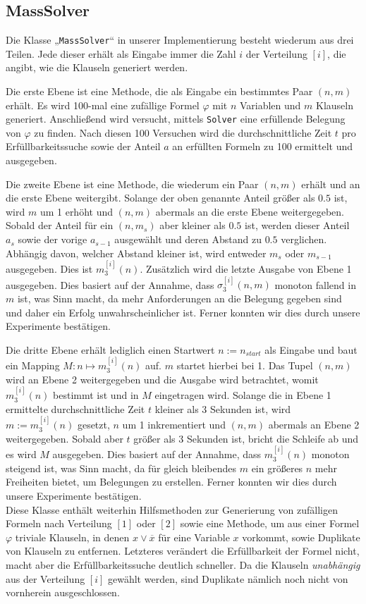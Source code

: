 \documentclass[maincolor=black]{exercise}
\newcommand{\anf}[1]{„#1“}
\newcommand{\non}[1]{\overline{#1}}
\begin{document}
\subsection{MassSolver}
Die Klasse \anf{\texttt{MassSolver}} in unserer Implementierung besteht wiederum aus drei Teilen. Jede dieser erhält als Eingabe immer die Zahl $i$ der Verteilung $[i]$, die angibt, wie die Klauseln generiert werden.\par
Die erste Ebene ist eine Methode, die als Eingabe ein bestimmtes Paar $(n,m)$ erhält. Es wird 100-mal eine zufällige Formel $\varphi$ mit $n$ Variablen und $m$ Klauseln generiert. Anschließend wird versucht, mittels \texttt{Solver} eine erfüllende Belegung von $\varphi$ zu finden. Nach diesen 100 Versuchen wird die durchschnittliche Zeit $t$ pro Erfüllbarkeitssuche sowie der Anteil $a$ an erfüllten Formeln zu 100 ermittelt und ausgegeben.\par
Die zweite Ebene ist eine Methode, die wiederum ein Paar $(n,m)$ erhält und an die erste Ebene weitergibt. Solange der oben genannte Anteil größer als $0.5$ ist, wird $m$ um 1 erhöht und $(n,m)$ abermals an die erste Ebene weitergegeben. Sobald der Anteil für ein $(n,m_s)$ aber kleiner als $0.5$ ist, werden dieser Anteil $a_s$ sowie der vorige $a_{s-1}$ ausgewählt und deren Abstand zu $0.5$ verglichen. Abhängig davon, welcher Abstand kleiner ist, wird entweder $m_s$ oder $m_{s-1}$ ausgegeben. Dies ist $m_3^{[i]}(n)$. Zusätzlich wird die letzte Ausgabe von Ebene 1 ausgegeben. Dies basiert auf der Annahme, dass $\sigma_3^{[i]}(n,m)$ monoton fallend in $m$ ist, was Sinn macht, da mehr Anforderungen an die Belegung gegeben sind und daher ein Erfolg unwahrscheinlicher ist. Ferner konnten wir dies durch unsere Experimente bestätigen.\par
Die dritte Ebene erhält lediglich einen Startwert $n := n_{start}$ als Eingabe und baut ein Mapping $M: n \mapsto m_3^{[i]}(n)$ auf. $m$ startet hierbei bei 1. Das Tupel $(n,m)$ wird an Ebene 2 weitergegeben und die Ausgabe wird betrachtet, womit $m_3^{[i]}(n)$ bestimmt ist und in $M$ eingetragen wird. Solange die in Ebene 1 ermittelte durchschnittliche Zeit $t$ kleiner als 3 Sekunden ist, wird $m := m_3^{[i]}(n)$ gesetzt, $n$ um 1 inkrementiert und $(n,m)$ abermals an Ebene 2 weitergegeben. Sobald aber $t$ größer als 3 Sekunden ist, bricht die Schleife ab und es wird $M$ ausgegeben. Dies basiert auf der Annahme, dass $m_3^{[i]}(n)$ monoton steigend ist, was Sinn macht, da für gleich bleibendes $m$ ein größeres $n$ mehr Freiheiten bietet, um Belegungen zu erstellen. Ferner konnten wir dies durch unsere Experimente bestätigen.\\
Diese Klasse enthält weiterhin Hilfsmethoden zur Generierung von zufälligen Formeln nach Verteilung $[1]$ oder $[2]$ sowie eine Methode, um aus einer Formel $\varphi$ triviale Klauseln, in denen $x \vee \non{x}$ für eine Variable $x$ vorkommt, sowie Duplikate von Klauseln zu entfernen. Letzteres verändert die Erfüllbarkeit der Formel nicht, macht aber die Erfüllbarkeitssuche deutlich schneller. Da die Klauseln \emph{unabhängig} aus der Verteilung $[i]$ gewählt werden, sind Duplikate nämlich noch nicht von vornherein ausgeschlossen.
\end{document}

